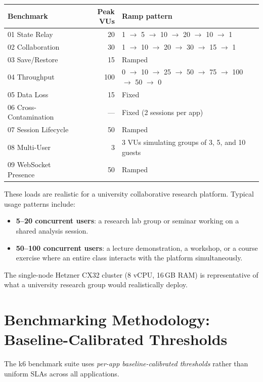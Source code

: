 \documentclass[11pt,a4paper]{article}
\begin{document}
\begin{tabularx}{\textwidth}{@{}lrX@{}}
\toprule
\textbf{Benchmark} & \textbf{Peak VUs} & \textbf{Ramp pattern} \\
\midrule
01 State Relay          & 20  & 1 $\to$ 5 $\to$ 10 $\to$ 20 $\to$ 10 $\to$ 1 \\
02 Collaboration        & 30  & 1 $\to$ 10 $\to$ 20 $\to$ 30 $\to$ 15 $\to$ 1 \\
03 Save/Restore         & 15  & Ramped \\
04 Throughput           & 100 & 0 $\to$ 10 $\to$ 25 $\to$ 50 $\to$ 75 $\to$ 100 $\to$ 50 $\to$ 0 \\
05 Data Loss            & 15  & Fixed \\
06 Cross-Contamination  & ---  & Fixed (2 sessions per app) \\
07 Session Lifecycle    & 50  & Ramped \\
08 Multi-User           & 3   & 3 VUs simulating groups of 3, 5, and 10 guests \\
09 WebSocket Presence   & 50  & Ramped \\
\bottomrule
\end{tabularx}

These loads are realistic for a university collaborative research platform.
Typical usage patterns include:

\begin{itemize}
  \item \textbf{5--20 concurrent users}: a research lab group or seminar
        working on a shared analysis session.
  \item \textbf{50--100 concurrent users}: a lecture demonstration, a
        workshop, or a course exercise where an entire class interacts
        with the platform simultaneously.
\end{itemize}

The single-node Hetzner CX32 cluster (8 vCPU, 16\,GB RAM) is
representative of what a university research group would realistically
deploy.

\section{Benchmarking Methodology: Baseline-Calibrated Thresholds}

The k6 benchmark suite uses \emph{per-app baseline-calibrated thresholds}
rather than uniform SLAs across all applications.
\end{document}
